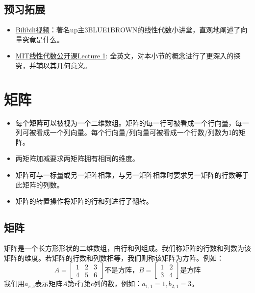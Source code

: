 \documentclass{ctexart}
\begin{document}
\subsection{预习拓展}
\begin{itemize}
    \item \href{https://www.bilibili.com/video/BV1ys411472E?p=2&share_source=copy_web}{Bilibili视频}：著名up主3BLUE1BROWN的线性代数小讲堂，直观地阐述了向量究竟是什么。
    \item \href{https://ocw.mit.edu/courses/mathematics/18-06-linear-algebra-spring-2010/video-lectures/lecture-1-the-geometry-of-linear-equations/}{MIT线性代数公开课Lecture 1}: 全英文，对本小节的概念进行了更深入的探究，并辅以其几何意义。
\end{itemize}


\section{矩阵} \label{matrix}
\begin{itemize}
    \item 每个\textbf{矩阵}可以被视为一个二维数组。矩阵的每一行可被看成一个行向量，每一列可被看成一个列向量。每个行向量/列向量可被看成一个行数/列数为1的矩阵。
    \item 两矩阵加减要求两矩阵拥有相同的维度。
    \item 矩阵可与一标量或另一矩阵相乘，与另一矩阵相乘时要求另一矩阵的行数等于此矩阵的列数。
    \item 矩阵的转置操作将矩阵的行和列进行了翻转。
\end{itemize}
\subsection{矩阵}
矩阵是一个长方形形状的二维数组，由行和列组成。我们称矩阵的行数和列数为该矩阵的维度。若矩阵的行数和列数相等，我们则称该矩阵为方阵。例如：\[A = \begin{bmatrix}
1&2&3\\
4&5&6
\end{bmatrix}不是方阵，B = \begin{bmatrix}
1&2\\
3&4
\end{bmatrix}是方阵\]
我们用$a_{r,c}$表示矩阵\textit{A}第r行第c列的数，例如：$a_{1,1} = 1, b_{2,1} = 3$。
\end{document}
